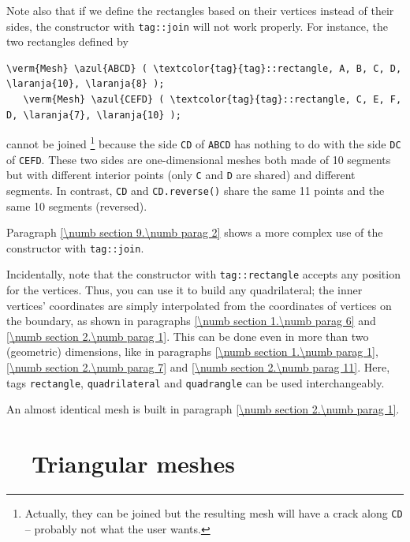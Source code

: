 Note also that if we define the rectangles based on their vertices instead of their sides, 
the {\small\tt {}} constructor with {\small\tt \textcolor{tag}{tag}::join} will
not work properly. 
For instance, the two rectangles defined by

\begin{Verbatim}[commandchars=\\\{\},formatcom=\small\tt,baselinestretch=0.94]
   \verm{Mesh} \azul{ABCD} ( \textcolor{tag}{tag}::rectangle, A, B, C, D, \laranja{10}, \laranja{8} );
   \verm{Mesh} \azul{CEFD} ( \textcolor{tag}{tag}::rectangle, C, E, F, D, \laranja{7}, \laranja{10} );
\end{Verbatim}

\noindent cannot be joined%
\footnote {Actually, they can be joined but the resulting mesh will have
a crack along {\small\tt CD} -- probably not what the user wants.}
because the side {\small\tt CD} of {\small\tt ABCD} has nothing to do with the side 
{\small\tt DC} of {\small\tt CEFD}.
These two sides are one-dimensional meshes both made of 10 segments but with different
interior points (only {\small\tt C} and {\small\tt D} are shared) and different segments.
In contrast, {\small\tt CD} and {\small\tt CD.reverse()} share the same 11 points and
the same 10 segments (reversed).

Paragraph \ref{\numb section 9.\numb parag 2} shows a more complex use of the
{\small\tt {}} constructor with {\small\tt \textcolor{tag}{tag}::join}.

Incidentally, note that the {\small\tt {}} constructor with
{\small\tt \textcolor{tag}{tag}::rectangle} accepts any position for the vertices. 
Thus, you can use it to build any quadrilateral; the inner vertices' coordinates are simply
interpolated from the coordinates of vertices on the boundary, as shown in paragraphs
\ref{\numb section 1.\numb parag 6} and \ref{\numb section 2.\numb parag 1}.
This can be done even in more than two (geometric) dimensions, like in
paragraphs \ref{\numb section 1.\numb parag 1}, \ref{\numb section 2.\numb parag 7} and
\ref{\numb section 2.\numb parag 11}.
Here, tags {\small\tt rectangle}, {\small\tt quadrilateral} and {\small\tt quadrangle}
can be used interchangeably.

An almost identical mesh is built in paragraph \ref{\numb section 2.\numb parag 1}.


\section{~~Triangular meshes}\label{\numb section 1.\numb parag 5}

